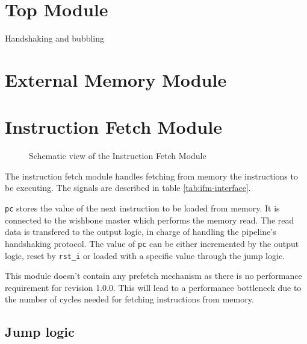 \newpage

\section{Top Module}

\begin{content}
  Handshaking and bubbling
\end{content}

\newpage

\section{External Memory Module}
\newpage

\section{Instruction Fetch Module}
\begin{figure}[h!]
    \centering
    
    \caption{Schematic view of the Instruction Fetch Module}
    \label{fig:regm}
\end{figure}

\begin{content}
The instruction fetch module handles fetching from memory the instructions to be executing. The signals are described in table \ref{tab:ifm-interface}. 
\end{content}



\begin{content}
  \texttt{pc} stores the value of the next instruction to be loaded from memory. It is connected to the wishbone master which performs the memory read. The read data is transfered to the output logic, in charge of handling the pipeline's handshaking protocol. The value of \texttt{pc} can be either incremented by the output logic, reset by \texttt{rst\_i} or loaded with a specific value through the jump logic.

  This module doesn't contain any prefetch mechanism as there is no performance requirement for revision 1.0.0. This will lead to a performance bottleneck due to the number of cycles needed for fetching instructions from memory.
\end{content}

\subsection{Jump logic}

